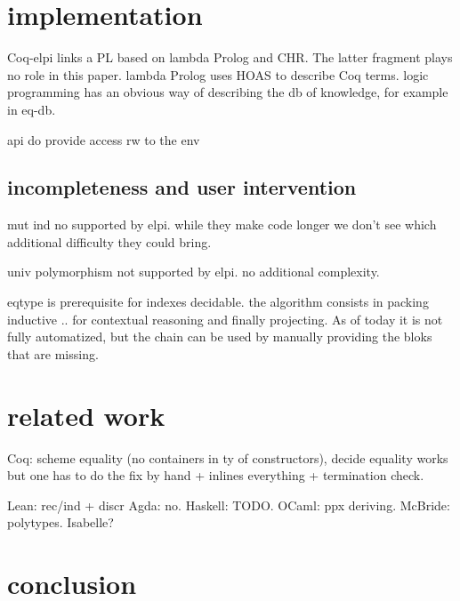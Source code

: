 \documentclass[sigplan,10pt,review]{acmart}\settopmatter{printfolios=true,printccs=false,printacmref=false}
\begin{document}
\section{implementation} %
\label{sec:elpi}

Coq-elpi links a PL based on lambda Prolog and CHR.
The latter fragment plays no role in this paper.
lambda Prolog uses HOAS to describe Coq terms.
logic programming has an obvious way of describing the db of
knowledge, for example in eq-db.

api do provide access rw to the env

\subsection{incompleteness and user intervention} %

mut ind no supported by elpi. while they make code longer we don't see
which additional difficulty they could bring.

univ polymorphism not supported by elpi. no additional complexity.

eqtype is prerequisite for indexes decidable. the algorithm
consists in packing inductive { .. } for contextual reasoning
and finally projecting. As of today it is not fully automatized, but
the chain can be used by manually providing the bloks that are missing.

\section{related work} %
\label{sec:related}

Coq: scheme equality (no containers in ty of constructors),
decide equality works but one has to do the fix by hand + inlines everything
+ termination check.

Lean: rec/ind + discr
Agda: no.
Haskell: TODO.
OCaml: ppx deriving.
McBride: polytypes. Isabelle?

\section{conclusion} %
\label{sec:conclusion}
\end{document}
